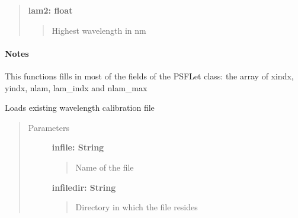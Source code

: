 \documentclass[letterpaper,10pt,english]{sphinxmanual}
\begin{document}
\begin{fulllineitems}
\begin{fulllineitems}
\begin{quote}
\begin{description}
\textbf{lam2: float}
\begin{quote}

Highest wavelength in nm
\end{quote}

\end{description}\end{quote}
\paragraph{Notes}

This functions fills in most of the fields of the PSFLet class: the array
of xindx, yindx, nlam, lam\_indx and nlam\_max

\end{fulllineitems}


\begin{fulllineitems}
\label{tools:tools.locate_psflets.PSFLets.loadpixsol}
Loads existing wavelength calibration file
\begin{quote}\begin{description}
\item[{Parameters}] \leavevmode
\textbf{infile: String}
\begin{quote}

Name of the file
\end{quote}

\textbf{infiledir: String}
\begin{quote}

Directory in which the file resides
\end{quote}

\end{description}\end{quote}

\end{fulllineitems}


\begin{fulllineitems}
\label{tools:tools.locate_psflets.PSFLets.monochrome_coef}
\end{fulllineitems}



\end{fulllineitems}
\end{document}
